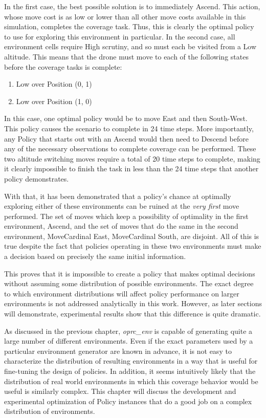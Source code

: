 In the first case, the best possible solution is to immediately Ascend. This action, whose move cost is as low or lower than all other move costs available in this simulation, completes the coverage task. Thus, this is clearly the optimal policy to use for exploring this environment in particular. In the second case, all environment cells require High scrutiny, and so must each be visited from a Low altitude. This means that the drone must move to each of the following states before the coverage tasks is complete:

\begin{enumerate}
	\item Low over Position (0, 1)
	\item Low over Position (1, 0)
\end{enumerate}

In this case, one optimal policy would be to move East and then South-West. This policy causes the scenario to complete in 24 time steps. More importantly, any Policy that starts out with an Ascend would then need to Descend before any of the necessary observations to complete coverage can be performed. These two altitude switching moves require a total of 20 time steps to complete, making it clearly impossible to finish the task in less than the 24 time steps that another policy demonstrates. 

With that, it has been demonstrated that a policy's chance at optimally exploring either of these environments can be ruined at the \textit{very first} move performed. The set of moves which keep a possibility of optimality in the first environment, {Ascend}, and the set of moves that do the same in the second environment, {MoveCardinal East, MoveCardinal South}, are disjoint. All of this is true despite the fact that policies operating in these two environments must make a decision based on precisely the same initial information.

This proves that it is impossible to create a policy that makes optimal decisions without assuming some distribution of possible environments. The exact degree to which environment distributions will affect policy performance on larger environments is not addressed analytically in this work. However, as later sections will demonstrate, experimental results show that this difference is quite dramatic.

As discussed in the previous chapter, \textit{oprc\_env} is capable of generating quite a large number of different environments. Even if the exact parameters used by a particular environment generator are known in advance, it is not easy to characterize the distribution of resulting environments in a way that is useful for fine-tuning the design of policies. In addition, it seems intuitively likely that the distribution of real world environments in which this coverage behavior would be useful is similarly complex. This chapter will discuss the development and experimental optimization of Policy instances that do a good job on a complex distribution of environments.

